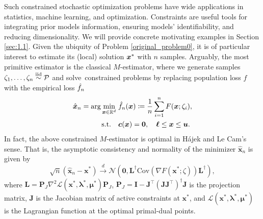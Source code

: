 \documentclass[aos]{imsart}
\numberwithin{equation}{section}
\theoremstyle{plain}
\begin{document}
Such constrained stochastic optimization problems have wide applications in statistics, machine learning, and optimization. Constraints are useful tools for integrating prior models information, ensuring models' identifiability, and reducing dimensionality. 
We will provide concrete motivating examples in Section \ref{sec:1.1}. 
Given the ubiquity of Problem \eqref{original_problem0}, it is of particular interest to estimate its (local) solution $\tx$ with $n$ samples. Arguably, the most primitive estimator is the classical $M$-estimator, where we generate samples $\zeta_1,\ldots,\zeta_n\stackrel{\text{iid}}{\sim} \P$ and solve~constrained problems by replacing population loss $f$ with the empirical loss $\hf_n$
\begin{equation*}
	\begin{split}
		\hx_n  = \arg\min_{\bx\in\mR^d}\; & \hf_n(\bx)\coloneqq \frac{1}{n}\sum_{i=1}^{n} F(\bx;\zeta_i),\\
		\text{s.t.} \hspace{1em} & \bm{c}(\bm{x}) = \bm{0},\quad \bm{\ell} \leq \bm{x} \leq \bm{u}.
	\end{split}
\end{equation*}
In fact, the above constrained $M$-estimator is optimal in  H\'ajek and Le Cam's sense.
That is, the asymptotic consistency and normality of the minimizer $\hat{\bm{x}}_{n}$ is given by 
\begin{equation}
\label{M-estimator}
    \sqrt{n} \left( \hat{\bm{x}}_{n} - \bm{x}^{*} \right) \stackrel{d}{\longrightarrow} \mathcal{N} \left( \bm{0}, \bm{L}^{\dag} \text{Cov}\left( \nabla F(\bm{x}^{*};\zeta) \right) \bm{L}^{\dag}\right),
\end{equation}
where $\bm{L} = \bm{P}_{J} \nabla^2 \mathcal{L}(\bm{x}^{*},\bm{\lambda}^{*},\bm{\mu}^{*})\bm{P}_{J}$, $\bm{P}_{J} = \bm{I} - \bm{J}^{\top}\left( \bm{J}\bm{J}^{\top}\right)^{\dag}\bm{J}$ is the projection matrix, $\bm{J}$ is the Jacobian matrix of active constraints at $\bm{x}^{*}$, and $\mathcal{L}(\bm{x}^{*},\bm{\lambda}^{*},\bm{\mu}^{*})$ is the Lagrangian function at the optimal primal-dual points. 
\end{document}

